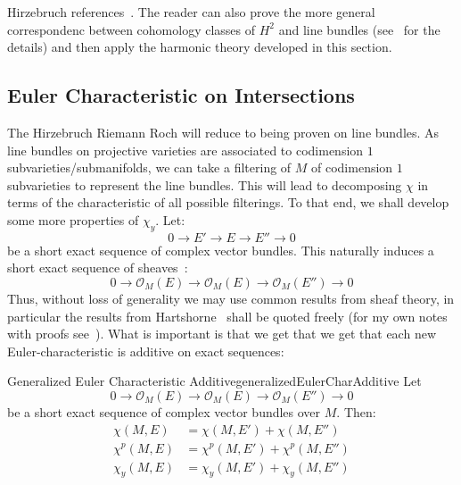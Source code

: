 \documentclass{book}
\newenvironment{Proof}[1][]
  {\begin{ProofTcb}[#1]}
  {\end{ProofTcb}}
\newcommand{\CO}{{\mathcal{O}}}
\begin{document}
\begin{Proof}
  Hirzebruch references~\cite[p.127, Thm~15.9.1]{hirzebruchTopologicalMethodsAlgebraic1995}. The reader can
  also prove the more general correspondenc between cohomology classes of $H^2$ and line bundles
  (see~\cite{NateKTheory} for the details) and then apply the harmonic theory developed in this section.
\end{Proof}

\subsection{Euler Characteristic on Intersections}\label{sec:propGenerlizedEulerChar}

The Hirzebruch Riemann Roch will reduce to being proven on line bundles. As line bundles on projective
varieties are associated to codimension $1$ subvarieties/submanifolds, we can take a filtering of $M$ of codimension $1$
subvarieties to represent the line bundles. This will lead to decomposing $\chi$ in terms of the characteristic
of all possible filterings. To that end, we shall develop some more properties of $\chi_y$. Let:
\[
  0 \to E' \to E \to E'' \to 0
\]
be a short exact sequence of complex vector bundles. This naturally induces a short exact sequence of
sheaves~\cite{NateAlgGeo}:
\[
  0 \to \CO_M(E) \to \CO_M(E) \to \CO_M({E''}) \to 0
\]
Thus, without loss of generality we may use common results from sheaf theory, in particular the results from
Hartshorne~\cite{hartshorneAlgebraicGeometry2013} shall be quoted freely (for my own notes with proofs
see~\cite{NateAlgGeo}). What is important is that we get that we get that each new Euler-characteristic is
additive on exact sequences:

\begin{thm}{Generalized Euler Characteristic Additive}{generalizedEulerCharAdditive}
  Let
\[
  0 \to \CO_M(E) \to \CO_M(E) \to \CO_M({E''}) \to 0
\]
  be a short exact sequence of complex vector bundles over $M$. Then:
  \begin{align*}
   \chi(M, E) &= \chi(M, E') + \chi(M, E'')\\
   \chi^p(M, E) &= \chi^p(M, E') + \chi^p(M, E'')\\
   \chi_y(M, E) &= \chi_y(M, E') + \chi_y(M, E'')
  \end{align*}
\end{thm}
\end{document}
